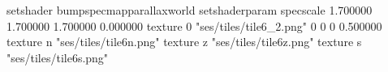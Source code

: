 setshader bumpspecmapparallaxworld
setshaderparam specscale 1.700000 1.700000 1.700000 0.000000
texture 0 "ses/tiles/tile6_2.png" 0 0 0 0.500000
texture n "ses/tiles/tile6n.png"
texture z "ses/tiles/tile6z.png"
texture s "ses/tiles/tile6s.png"

